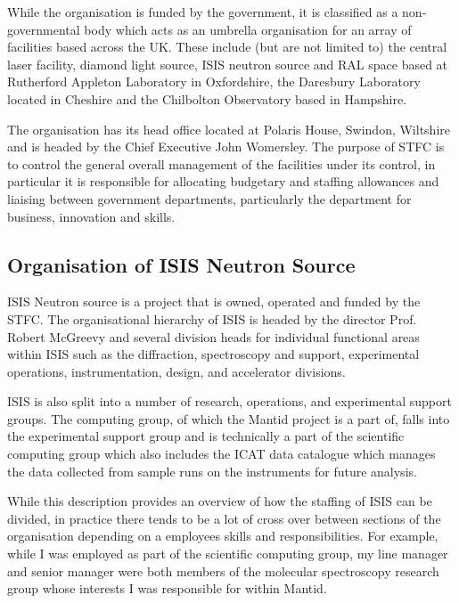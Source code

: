 \documentclass[paper=a4, fontsize=11pt]{scrartcl}	%
\numberwithin{equation}{section}															%
\numberwithin{figure}{section}																%
\numberwithin{table}{section}																%
\begin{document}
While the organisation is funded by the government, it is classified as a non-governmental body which acts as an umbrella organisation for an array of facilities based across the UK. These include (but are not limited to) the central laser facility, diamond light source, ISIS neutron source and RAL space based at Rutherford Appleton Laboratory in Oxfordshire, the Daresbury Laboratory located in Cheshire and the Chilbolton Observatory based in Hampshire. 

The organisation has its head office located at Polaris House, Swindon, Wiltshire and is headed by the Chief Executive John Womersley. The purpose of STFC is to control the general overall management of the facilities under its control, in particular it is responsible for allocating budgetary and staffing allowances and liaising between government departments, particularly the department for business, innovation and skills.

\subsection{Organisation of ISIS Neutron Source}
ISIS Neutron source is a project that is owned, operated and funded by the STFC. The organisational hierarchy of ISIS is headed by the director Prof. Robert McGreevy and several division heads for individual functional areas within ISIS such as the diffraction, spectroscopy and support, experimental operations, instrumentation, design, and accelerator divisions.

ISIS is also split into a number of research, operations, and experimental support groups. The computing group, of which the Mantid project is a part of, falls into the experimental support group and is technically a part of the scientific computing group which also includes the ICAT data catalogue which manages the data collected from sample runs on the instruments for future analysis.

While this description provides an overview of how the staffing of ISIS can be divided, in practice there tends to be a lot of cross over between sections of the organisation depending on a employees skills and responsibilities. For example, while I was employed as part of the scientific computing group, my line manager and senior manager were both members of the molecular spectroscopy research group whose interests I was responsible for within Mantid.
\end{document}
